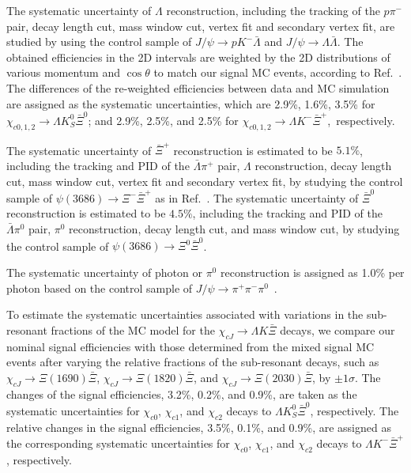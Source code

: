 \documentclass[amsmath,amssymb,twocolumn,prd,floatfix,showpacs,nofootinbib]{revtex4-1}
\def\chic#1{\ensuremath{\chi_{c#1}}\xspace}
\begin{document}
The systematic uncertainty of $\Lambda$ reconstruction, including the tracking of the $p\pi^-$ pair, decay length cut, mass window cut, vertex fit and secondary vertex fit, are studied by using the control sample of $J/\psi\to pK^-\bar \Lambda$ and $J/\psi\to\Lambda\bar \Lambda$. The obtained efficiencies in the 2D intervals are weighted by the 2D distributions of various momentum and $\cos\theta$ to match our signal MC events, according to Ref.~\cite{ref::Lambda}. The differences of the re-weighted efficiencies between data and MC simulation are assigned as the systematic uncertainties, which are 2.9\%, 1.6\%, 3.5\% for $\chi_{c0,1,2}\to \Lambda K^0_S\bar \Xi^0$; and
2.9\%, 2.5\%, and 2.5\% for $\chi_{c0,1,2}\to \Lambda K^-\bar \Xi^+$,~respectively.

The systematic uncertainty of $\bar\Xi^+$ reconstruction is estimated to be $5.1\%$, including the tracking and PID of the $\bar{\Lambda}\pi^+$ pair, $\Lambda$ reconstruction, decay length cut, mass window cut, vertex fit and secondary vertex fit, by studying the control sample of $\psi(3686)\to\Xi^-\bar{\Xi}^+$ as in Ref.~\cite{ref::Xi}. The systematic uncertainty of $\bar\Xi^0$ reconstruction is estimated to be $4.5\%$, including the tracking and PID of the $\bar{\Lambda}\pi^0$ pair, $\pi^0$ reconstruction, decay length cut, and mass window cut, by studying the control sample of $\psi(3686)\to\Xi^0\bar{\Xi}^0$.

The systematic uncertainty of photon or $\pi^0$ reconstruction is assigned as  1.0\% per photon based on the control sample of $J/\psi\to\pi^+\pi^-\pi^0$~\cite{ref::gamma-recon}.

To estimate the systematic uncertainties associated with variations in the sub-resonant fractions of the MC model for the $\chi_{cJ}\to \Lambda K\bar \Xi$ decays, we compare our nominal signal efficiencies with those determined from the mixed signal MC events after varying the relative fractions of the sub-resonant decays, such as 
$\chi_{cJ}\to \Xi(1690)\bar{\Xi}$, $\chi_{cJ}\to \Xi(1820)\bar{\Xi}$, and $\chi_{cJ}\to \Xi(2030)\bar{\Xi}$, by $\pm 1\sigma$. The changes of the signal efficiencies, 3.2\%, 0.2\%, and 0.9\%, are taken as the systematic uncertainties for \chic{0}, \chic{1}, and \chic{2} decays to $\Lambda K^0_S\bar \Xi^0$, respectively. The relative changes in the signal efficiencies, 3.5\%, 0.1\%, and 0.9\%, are assigned as the corresponding systematic uncertainties for \chic{0}, \chic{1}, and \chic{2} decays to $\Lambda K^-\bar \Xi^+$, respectively.
\end{document}
